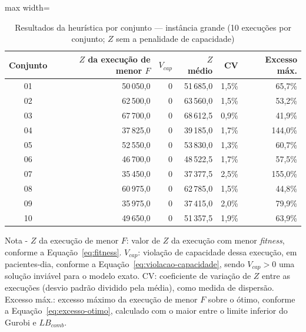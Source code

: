 \begin{table}[htbp]
    \caption[Resultados da heurística por conjunto --- instância grande]{Resultados da heurística por conjunto --- instância grande (10 execuções por conjunto; $Z$ sem a penalidade de capacidade)}
    \label{tab:res-z-grande}
    \centering
    \begin{adjustbox}{max width=\textwidth}
    \begin{tabular}{crrrrr}
        \hline
        \textbf{Conjunto} & \textbf{$Z$ da execução de menor $F$} & \textbf{$V_{cap}$} & \textbf{$Z$ médio} & \textbf{CV} & \textbf{Excesso máx.} \\
        \hline
        01 & 50\,050,0 & 0 & 51\,685,0 & 1,5\% & 65,7\% \\
        02 & 62\,500,0 & 0 & 63\,560,0 & 1,5\% & 53,2\% \\
        03 & 67\,700,0 & 0 & 68\,612,5 & 0,9\% & 41,9\% \\
        04 & 37\,825,0 & 0 & 39\,185,0 & 1,7\% & 144,0\% \\
        05 & 52\,550,0 & 0 & 53\,830,0 & 1,3\% & 60,7\% \\
        06 & 46\,700,0 & 0 & 48\,522,5 & 1,7\% & 57,5\% \\
        07 & 35\,450,0 & 0 & 37\,377,5 & 2,5\% & 155,0\% \\
        08 & 60\,975,0 & 0 & 62\,785,0 & 1,5\% & 44,8\% \\
        09 & 35\,975,0 & 0 & 37\,415,0 & 2,0\% & 79,9\% \\
        10 & 49\,650,0 & 0 & 51\,357,5 & 1,9\% & 63,9\% \\
        \hline
    \end{tabular}
    \end{adjustbox}
    \par\smallskip
    {\footnotesize Nota - $Z$ da execução de menor $F$: valor de $Z$ da execução com menor \textit{fitness}, conforme a Equação~\eqref{eq:fitness}. $V_{cap}$: violação de capacidade dessa execução, em pacientes-dia, conforme a Equação~\eqref{eq:violacao-capacidade}, sendo $V_{cap} > 0$ uma solução inviável para o modelo exato. CV: coeficiente de variação de $Z$ entre as execuções (desvio padrão dividido pela média), como medida de dispersão. Excesso máx.: excesso máximo da execução de menor $F$ sobre o ótimo, conforme a Equação~\eqref{eq:excesso-otimo}, calculado com o maior entre o limite inferior do Gurobi e $LB_{comb}$.}
\end{table}
